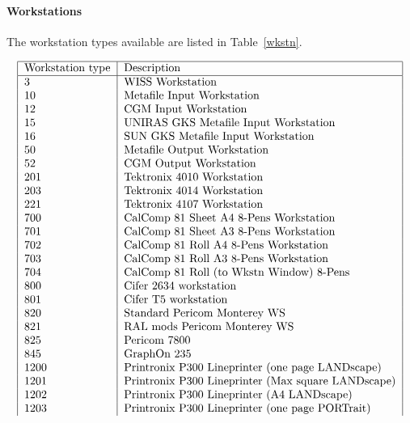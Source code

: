 \paragraph{Workstations}
The workstation types available are listed in Table~\ref{wkstn}.

\begin{table}\caption{GKS Workstation Types}\label{wkstn}
\[\begin{tabular}{|l|l|}
\hline
Workstation type & Description \\
\hline
3       & WISS Workstation \\
10      & Metafile Input Workstation \\
12      & CGM Input Workstation \\
15      & UNIRAS GKS Metafile Input Workstation \\
16      & SUN GKS Metafile Input Workstation \\
50      & Metafile Output Workstation \\
52      & CGM Output Workstation \\
201     & Tektronix 4010 Workstation \\
203     & Tektronix 4014 Workstation \\
221     & Tektronix 4107 Workstation \\
700     & CalComp 81 Sheet A4 8-Pens Workstation \\
701     & CalComp 81 Sheet A3 8-Pens Workstation \\
702     & CalComp 81 Roll A4 8-Pens Workstation \\
703     & CalComp 81 Roll A3 8-Pens Workstation \\
704     & CalComp 81 Roll (to Wkstn Window) 8-Pens \\
800     & Cifer 2634 workstation \\
801     & Cifer T5 workstation \\
820     & Standard Pericom Monterey WS \\
821     & RAL mods Pericom Monterey WS \\
825	& Pericom 7800 \\
845	& GraphOn 235 \\
1200    & Printronix P300 Lineprinter (one page LANDscape) \\
1201    & Printronix P300 Lineprinter (Max square LANDscape) \\
1202    & Printronix P300 Lineprinter (A4 LANDscape) \\
1203    & Printronix P300 Lineprinter (one page PORTrait) \\

\end{tabular}\]
\end{table}

